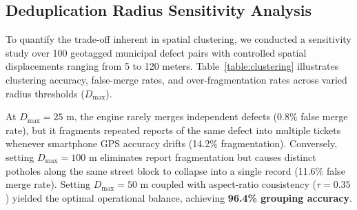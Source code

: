 \begin{table}[!t]
\caption{Inference latency breakdown on NVIDIA T4 GPU}
\label{table:latency}
\centering
{}
\end{table}

\subsection{Deduplication Radius Sensitivity Analysis}
To quantify the trade-off inherent in spatial clustering, we conducted a sensitivity study over 100 geotagged municipal defect pairs with controlled spatial displacements ranging from 5 to 120 meters. Table~\ref{table:clustering} illustrates clustering accuracy, false-merge rates, and over-fragmentation rates across varied radius thresholds ($D_{\text{max}}$). 

At $D_{\text{max}} = 25\text{ m}$, the engine rarely merges independent defects (0.8\% false merge rate), but it fragments repeated reports of the same defect into multiple tickets whenever smartphone GPS accuracy drifts (14.2\% fragmentation). Conversely, setting $D_{\text{max}} = 100\text{ m}$ eliminates report fragmentation but causes distinct potholes along the same street block to collapse into a single record (11.6\% false merge rate). Setting $D_{\text{max}} = 50\text{ m}$ coupled with aspect-ratio consistency ($\tau = 0.35$) yielded the optimal operational balance, achieving \textbf{96.4\% grouping accuracy}.

\begin{table}[!t]
\caption{Spatial deduplication accuracy across distance thresholds}
\label{table:clustering}
\centering
{}
\end{table}

